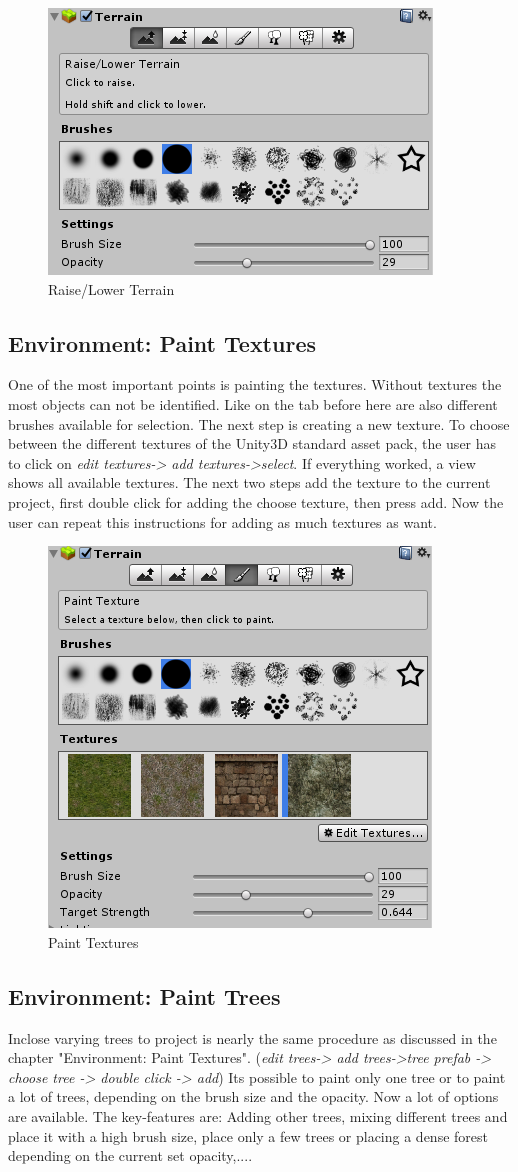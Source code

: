 \documentclass[conference]{IEEEtran}
\begin{document}
\begin{figure}[htbp]
  \includegraphics[width=.4\textwidth]{pictures/raise_lower_terrain}
  \caption{Raise/Lower Terrain}
  \label{fig:raise_lower_terrain}
\end{figure}

\subsection{Environment: Paint Textures}
One of the most important points is painting the textures. Without textures the most objects can not be identified. 
Like on the tab before here are also different brushes available for selection. The next step is creating a new texture. 
To choose between the different textures of the Unity3D standard asset pack, the user has to click on \emph{edit textures-> add textures->select}. If everything worked, a view shows all available textures. The next two steps add the texture to the current project, first double click for adding the choose texture, then press add. Now the user can repeat this instructions for adding as much textures as want.

\begin{figure}[htbp]
  \includegraphics[width=.4\textwidth]{pictures/paint_textures}
  \caption{Paint Textures}
  \label{fig:paint_textures}
\end{figure}

\subsection{Environment: Paint Trees}
Inclose varying trees to project is nearly the same procedure as discussed in the chapter "Environment: Paint Textures". (\emph{edit trees-> add trees->tree prefab -> choose tree -> double click -> add})
Its possible to paint only one tree or to paint a lot of trees, depending on the brush size and the opacity. Now a lot of options are available. The key-features are: Adding other trees, mixing different trees and place it with a high brush size, place only a few trees or placing a dense forest depending on the current set opacity,....
\end{document}
